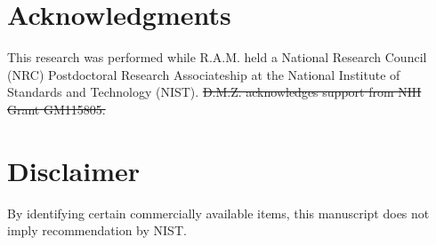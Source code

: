 \documentclass[9pt,bestpractices]{livecoms}
\providecommand{\DIFdel}[1]{{\protect\color{red}\sout{#1}}}                      %
\providecommand{\DIFaddbegin}{} %
\providecommand{\DIFaddend}{} %
\providecommand{\DIFdelbegin}{} %
\providecommand{\DIFdelend}{} %
\begin{document}
\DIFaddbegin 


\DIFaddend

\section*{Acknowledgments}

This research was performed while R.A.M. held a National Research Council (NRC) Postdoctoral Research Associateship at the National Institute of Standards and Technology (NIST).
\DIFdelbegin \DIFdel{D.M.Z. acknowledges support from NIH Grant GM115805.
}\DIFdelend 

\section*{Disclaimer}

By identifying certain commercially available items, this manuscript does not imply recommendation by NIST.
\end{document}
